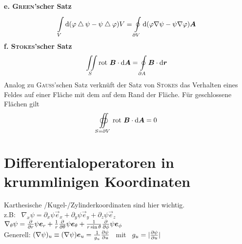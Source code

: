 \ \\
\textbf{e. \textsc{Green}'scher Satz}\\
\begin{equation*}
\int\limits_{{V}}^{{}}\mathrm{d}{(\varphi\bigtriangleup\psi-\psi\bigtriangleup\varphi)}{V}=\oint\limits_{{\partial V}}^{{}}\mathrm{d}{(\varphi\nabla\psi-\psi\nabla\varphi)}{\bm{A}}
\end{equation*}
\linebreak
\textbf{f. \textsc{Stokes}'scher Satz}\\
\begin{equation*}
\iint\limits_S\text{rot }\bm{B}\cdot\mathrm{d}\bm{A}=\oint\limits_{\partial A}\bm{B}\cdot\mathrm{d}\bm{r}
\end{equation*}
Analog zu \textsc{Gauss}'schen Satz verknüft der Satz von \textsc{Stokes} das Verhalten eines Feldes auf einer Fläche mit dem auf dem Rand der Fläche. Für geschlossene Flächen gilt
\begin{equation*}
\oiint\limits_{S=\partial V}\text{rot }\bm{B}\cdot\mathrm{d}\bm{A}=0
\end{equation*}

\section{Differentialoperatoren in krummlinigen Koordinaten}
Karthesische /Kugel-/Zylinderkoordinaten sind hier wichtig.\\
\linebreak
z.B: \ $\nabla_x\psi=\partial_x\psi\vec{e}_x+\partial_y\psi\vec{e}_y+\partial_z\psi\vec{e}_z$\\
\linebreak
$\nabla_\theta\psi=\frac{\partial{}}{\partial{r}}\psi\bm{e}_r+\frac{1}{r}\frac{\partial{}}{\partial{\theta}}\psi\bm{e}_\theta+\frac{1}{r\sin\theta}\frac{\partial{}}{\partial{\phi}}\psi\bm{e}_\phi$\\
\linebreak
Generell: $(\nabla\psi)_u\equiv(\nabla\psi)\bm{e}_u=\frac{1}{g_u}\frac{\partial{\psi}}{\partial{u}}$ \ mit \ $g_u=|\frac{\partial{\psi}}{\partial{u}}|$\\

